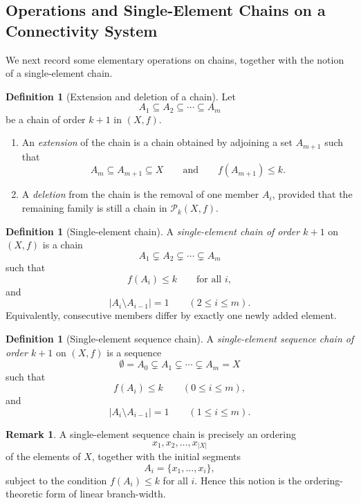 \documentclass[10pt]{book}
\theoremstyle{definition}
\newtheorem{remark}[theorem]{Remark}
\newtheorem{definition}[theorem]{Definition}
\begin{document}
\subsection{Operations and Single-Element Chains on a Connectivity System}

We next record some elementary operations on chains, together with the notion of a single-element chain.

\begin{definition}[Extension and deletion of a chain]
\label{def:operation_chain_extension}
Let
\[
A_1 \subseteq A_2 \subseteq \cdots \subseteq A_m
\]
be a chain of order \(k+1\) in \((X,f)\).

\begin{enumerate}
    \item An \emph{extension} of the chain is a chain obtained by adjoining a set \(A_{m+1}\) such that
    \[
    A_m \subseteq A_{m+1}\subseteq X
    \qquad\text{and}\qquad
    f(A_{m+1})\leq k.
    \]
    \item A \emph{deletion} from the chain is the removal of one member \(A_i\), provided that the remaining family is still a chain in \(\mathcal{P}_k(X,f)\).
\end{enumerate}
\end{definition}

\begin{definition}[Single-element chain]
\label{def:single_element_chain}
A \emph{single-element chain of order \(k+1\)} on \((X,f)\) is a chain
\[
A_1 \subsetneq A_2 \subsetneq \cdots \subsetneq A_m
\]
such that
\[
f(A_i)\leq k
\qquad\text{for all } i,
\]
and
\[
|A_i\setminus A_{i-1}|=1
\qquad (2\leq i\leq m).
\]
Equivalently, consecutive members differ by exactly one newly added element.
\end{definition}

\begin{definition}[Single-element sequence chain]
\label{def:single_element_sequence}
A \emph{single-element sequence chain of order \(k+1\)} on \((X,f)\) is a sequence
\[
\emptyset=A_0 \subsetneq A_1 \subsetneq \cdots \subsetneq A_m=X
\]
such that
\[
f(A_i)\leq k
\qquad (0\leq i\leq m),
\]
and
\[
|A_i\setminus A_{i-1}|=1
\qquad (1\leq i\leq m).
\]
\end{definition}

\begin{remark}
A single-element sequence chain is precisely an ordering
\[
x_1,x_2,\dots,x_{|X|}
\]
of the elements of \(X\), together with the initial segments
\[
A_i=\{x_1,\dots,x_i\},
\]
subject to the condition \(f(A_i)\leq k\) for all \(i\).
Hence this notion is the ordering-theoretic form of linear branch-width.
\end{remark}
\end{document}
